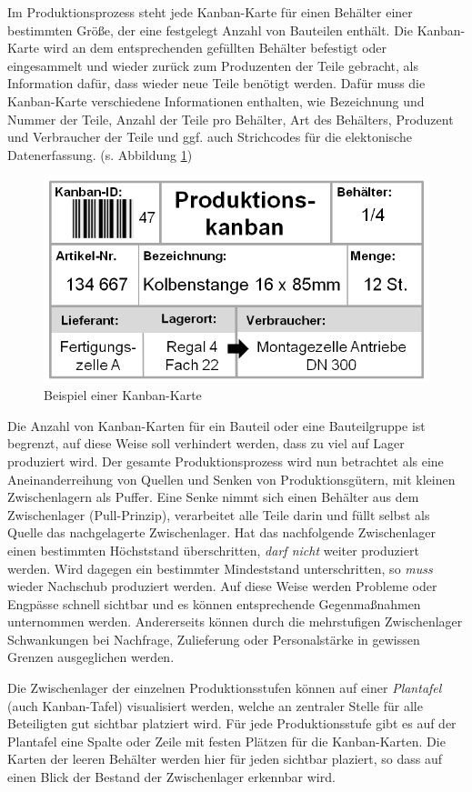 Im Produktionsprozess steht jede Kanban-Karte für einen Behälter einer bestimmten Größe, der eine festgelegt Anzahl von Bauteilen enthält.
Die Kanban-Karte wird an dem entsprechenden gefüllten Behälter befestigt oder eingesammelt und wieder zurück zum 
Produzenten der Teile gebracht, als Information dafür, dass wieder neue Teile benötigt werden. 
Dafür muss die Kanban-Karte verschiedene Informationen enthalten, wie Bezeichnung und Nummer der Teile, 
Anzahl der Teile pro Behälter, Art des Behälters, Produzent und Verbraucher der Teile und ggf. auch Strichcodes für die elektonische Datenerfassung.
(s. Abbildung \ref{Kanbankarte})
\begin{figure}[h]
\centering
\includegraphics[width=.60\textwidth]{img/kanban-karte.png}
\caption[Beispiel einer Kanban-Karte]{Beispiel einer Kanban-Karte\footnotemark}
\label{Kanbankarte}
\end{figure}

Die Anzahl von Kanban-Karten für ein Bauteil oder eine Bauteilgruppe ist begrenzt, auf diese Weise soll verhindert werden, dass zu viel auf Lager produziert wird.
Der gesamte Produktionsprozess wird nun betrachtet als eine Aneinanderreihung von Quellen und Senken von Produktionsgütern, mit kleinen Zwischenlagern als Puffer.
Eine Senke nimmt sich einen Behälter aus dem Zwischenlager (Pull-Prinzip), verarbeitet alle Teile darin und füllt selbst als Quelle das nachgelagerte Zwischenlager.
Hat das nachfolgende Zwischenlager einen bestimmten Höchststand überschritten, \emph{darf nicht} weiter produziert werden.
Wird dagegen ein bestimmter Mindeststand unterschritten, so \emph{muss} wieder Nachschub produziert werden.
Auf diese Weise werden Probleme oder Engpässe schnell sichtbar und es können entsprechende Gegenmaßnahmen unternommen werden.
Andererseits können durch die mehrstufigen Zwischenlager Schwankungen bei Nachfrage, Zulieferung oder Personalstärke in gewissen Grenzen ausgeglichen werden.

Die Zwischenlager der einzelnen Produktionsstufen können auf einer \emph{Plantafel} (auch Kanban-Tafel) visualisiert werden, welche an zentraler Stelle für alle Beteiligten gut sichtbar platziert wird.
Für jede Produktionsstufe gibt es auf der Plantafel eine Spalte oder Zeile mit festen Plätzen für die Kanban-Karten.
Die Karten der leeren Behälter werden hier für jeden sichtbar plaziert, so dass auf einen Blick der Bestand der Zwischenlager erkennbar wird.


